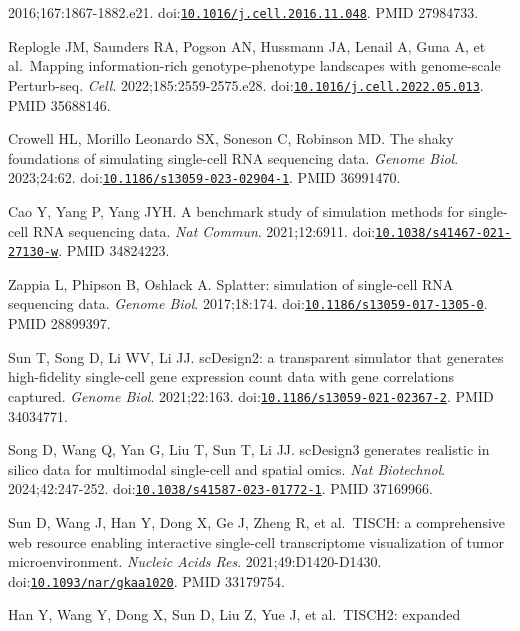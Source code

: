 \documentclass[11pt]{article}
\begin{document}
\begin{enumerate}[label={[\arabic*]},leftmargin=2.6em,labelsep=0.5em,itemsep=1.5pt]
  2016;167:1867-1882.e21.
  doi:\href{https://doi.org/10.1016/j.cell.2016.11.048}{\nolinkurl{10.1016/j.cell.2016.11.048}}.
  PMID 27984733.
\item
  Replogle JM, Saunders RA, Pogson AN, Hussmann JA, Lenail A, Guna A, et
  al.~Mapping information-rich genotype-phenotype landscapes with
  genome-scale Perturb-seq. \emph{Cell}. 2022;185:2559-2575.e28.
  doi:\href{https://doi.org/10.1016/j.cell.2022.05.013}{\nolinkurl{10.1016/j.cell.2022.05.013}}.
  PMID 35688146.
\item
  Crowell HL, Morillo Leonardo SX, Soneson C, Robinson MD. The shaky
  foundations of simulating single-cell RNA sequencing data.
  \emph{Genome Biol}. 2023;24:62.
  doi:\href{https://doi.org/10.1186/s13059-023-02904-1}{\nolinkurl{10.1186/s13059-023-02904-1}}.
  PMID 36991470.
\item
  Cao Y, Yang P, Yang JYH. A benchmark study of simulation methods for
  single-cell RNA sequencing data. \emph{Nat Commun}. 2021;12:6911.
  doi:\href{https://doi.org/10.1038/s41467-021-27130-w}{\nolinkurl{10.1038/s41467-021-27130-w}}.
  PMID 34824223.
\item
  Zappia L, Phipson B, Oshlack A. Splatter: simulation of single-cell
  RNA sequencing data. \emph{Genome Biol}. 2017;18:174.
  doi:\href{https://doi.org/10.1186/s13059-017-1305-0}{\nolinkurl{10.1186/s13059-017-1305-0}}.
  PMID 28899397.
\item
  Sun T, Song D, Li WV, Li JJ. scDesign2: a transparent simulator that
  generates high-fidelity single-cell gene expression count data with
  gene correlations captured. \emph{Genome Biol}. 2021;22:163.
  doi:\href{https://doi.org/10.1186/s13059-021-02367-2}{\nolinkurl{10.1186/s13059-021-02367-2}}.
  PMID 34034771.
\item
  Song D, Wang Q, Yan G, Liu T, Sun T, Li JJ. scDesign3 generates
  realistic in silico data for multimodal single-cell and spatial omics.
  \emph{Nat Biotechnol}. 2024;42:247-252.
  doi:\href{https://doi.org/10.1038/s41587-023-01772-1}{\nolinkurl{10.1038/s41587-023-01772-1}}.
  PMID 37169966.
\item
  Sun D, Wang J, Han Y, Dong X, Ge J, Zheng R, et al.~TISCH: a
  comprehensive web resource enabling interactive single-cell
  transcriptome visualization of tumor microenvironment. \emph{Nucleic
  Acids Res}. 2021;49:D1420-D1430.
  doi:\href{https://doi.org/10.1093/nar/gkaa1020}{\nolinkurl{10.1093/nar/gkaa1020}}.
  PMID 33179754.
\item
  Han Y, Wang Y, Dong X, Sun D, Liu Z, Yue J, et al.~TISCH2: expanded

\end{enumerate}
\end{document}
